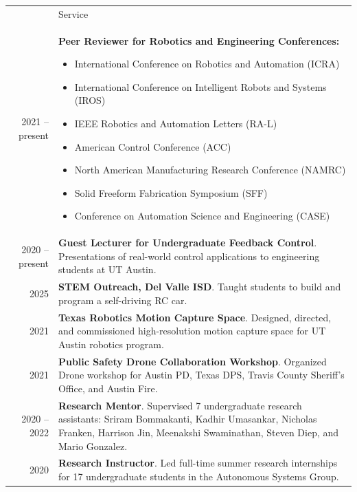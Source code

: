 \documentclass[letterpaper, 11pt]{article}
\newcommand{\headingfont}{\Large\color{CustomBlue}}
\newenvironment{SectionTable}[1]{
	\renewcommand*{\arraystretch}{1.3} %
	\setlength{\tabcolsep}{10pt}
	\begin{longtable}{Rp{4.9in}} & #1 \\}
{\end{longtable}}
\begin{document}
\begin{SectionTable}{\headingfont Service}
2021 -- present & \textbf{Peer Reviewer for Robotics and Engineering Conferences:}
\begin{itemize}[noitemsep, topsep=0pt]
\item International Conference on Robotics and Automation (ICRA)
\item International Conference on Intelligent Robots and Systems (IROS)
\item IEEE Robotics and Automation Letters (RA-L)
\item American Control Conference (ACC)
\item North American Manufacturing Research Conference (NAMRC)
\item Solid Freeform Fabrication Symposium (SFF)
\item Conference on Automation Science and Engineering (CASE)
\end{itemize} \\

2020 -- present & \textbf{Guest Lecturer for Undergraduate Feedback Control}. Presentations of real-world control applications to engineering students at UT Austin. \\

2025 & \textbf{STEM Outreach, Del Valle ISD}. Taught students to build and program a self-driving RC car. \\

2021 & \textbf{Texas Robotics Motion Capture Space}. Designed, directed, and commissioned high-resolution motion capture space for UT Austin robotics program. \\

2021 & \textbf{Public Safety Drone Collaboration Workshop}. Organized Drone workshop for Austin PD, Texas DPS, Travis County Sheriff's Office, and Austin Fire. \\

2020 -- 2022 & \textbf{Research Mentor}. Supervised 7 undergraduate research assistants: Sriram Bommakanti, Kadhir Umasankar, Nicholas Franken, Harrison Jin, Meenakshi Swaminathan, Steven Diep, and Mario Gonzalez. \\

2020 & \textbf{Research Instructor}. Led full-time summer research internships for 17 undergraduate students in the Autonomous Systems Group. \\

\end{SectionTable}
\end{document}
